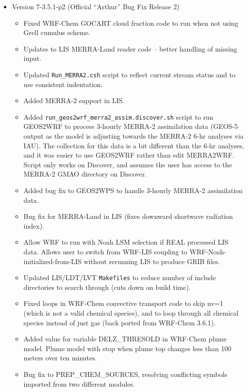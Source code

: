 \begin{itemize}
\item Version 7-3.5.1-p2 (Official ``Arthur'' Bug Fix Release 2)
  \begin{itemize}
  \item Fixed WRF-Chem GOCART cloud fraction code to run when not using Grell
    cumulus scheme.
  \item Updates to LIS MERRA-Land reader code -- better handling of missing 
    input.
  \item Updated \texttt{Run\_MERRA2.csh} script to reflect current stream 
    status and to use consistent indentation.
  \item Added MERRA-2 support in LIS. 
  \item Added \texttt{run\_geos2wrf\_merra2\_assim.discover.sh} script to run 
    GEOS2WRF to process 3-hourly MERRA-2 assimilation data (GEOS-5 output as 
    the model is adjusting towards the MERRA-2 6-hr analyses via IAU). The 
    collection for this data is a bit different than the 6-hr analyses, and it
    was easier to use GEOS2WRF rather than edit MERRA2WRF. Script only works 
    on Discover, and assumes the user has access to the MERRA-2 GMAO directory 
    on Discover.
  \item Added bug fix to GEOS2WPS to handle 3-hourly MERRA-2 assimilation data.
  \item Bug fix for MERRA-Land in LIS (fixes downward shortwave radiation 
    index).
  \item Allow WRF to run with Noah LSM selection if REAL processed LIS data. 
    Allows user to switch from WRF-LIS coupling to 
    WRF-Noah-initialized-from-LIS without rerunning LIS to produce GRIB files.
  \item Updated LIS/LDT/LVT \texttt{Makefiles} to reduce number of include 
    directories to search through (cuts down on build time).
  \item Fixed loops in WRF-Chem convective transport code to skip nv=1 (which 
    is not a valid chemical species), and to loop through all chemical species
    instead of just gas (back ported from WRF-Chem 3.6.1).
  \item Added value for variable DELZ\_THRESOLD in WRF-Chem plume model. 
    Plume model with stop when plume top changes less than 100 meters over 
    ten minutes.
  \item Bug fix to PREP\_CHEM\_SOURCES, resolving conflicting symbols imported 
    from two different modules. 
  \end{itemize}


\end{itemize}
